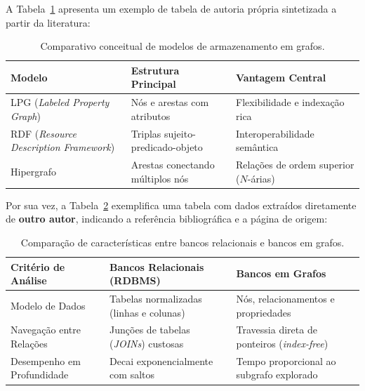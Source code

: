 \documentclass[cic,tc,biblatex]{iiufrgs}
\begin{document}
A Tabela~\ref{tab:exemplo_tabela_autor} apresenta um exemplo de tabela de autoria própria sintetizada a partir da literatura:

\begin{table}[htbp]
    \centering
    \caption{Comparativo conceitual de modelos de armazenamento em grafos.}
    \label{tab:exemplo_tabela_autor}
    \begin{tabular}{p{3.5cm}p{5.0cm}p{4.5cm}}
        \toprule
        \textbf{Modelo} & \textbf{Estrutura Principal} & \textbf{Vantagem Central} \\
        \midrule
        LPG (\textit{Labeled Property Graph}) & Nós e arestas com atributos & Flexibilidade e indexação rica \\
        RDF (\textit{Resource Description Framework}) & Triplas sujeito-predicado-objeto & Interoperabilidade semântica \\
        Hipergrafo & Arestas conectando múltiplos nós & Relações de ordem superior ($N$-árias) \\
        \bottomrule
    \end{tabular}
\end{table}

Por sua vez, a Tabela~\ref{tab:exemplo_tabela_externa} exemplifica uma tabela com dados extraídos diretamente de \textbf{outro autor}, indicando a referência bibliográfica e a página de origem:

\begin{table}[htbp]
    \centering
    \caption{Comparação de características entre bancos relacionais e bancos em grafos.}
    \label{tab:exemplo_tabela_externa}
    \begin{tabular}{p{3.8cm}p{4.5cm}p{4.8cm}}
        \toprule
        \textbf{Critério de Análise} & \textbf{Bancos Relacionais (RDBMS)} & \textbf{Bancos em Grafos} \\
        \midrule
        Modelo de Dados & Tabelas normalizadas (linhas e colunas) & Nós, relacionamentos e propriedades \\
        Navegação entre Relações & Junções de tabelas (\textit{JOINs}) custosas & Travessia direta de ponteiros (\textit{index-free}) \\
        Desempenho em Profundidade & Decai exponencialmente com saltos & Tempo proporcional ao subgrafo explorado \\
        \bottomrule
    \end{tabular}
\end{table}
\end{document}
